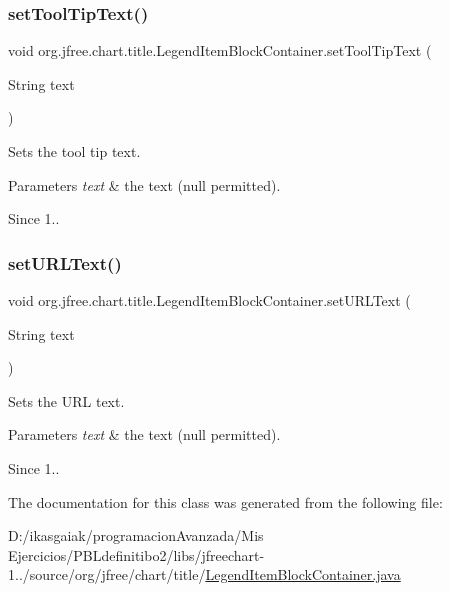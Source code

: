 \subsubsection{\texorpdfstring{set\+Tool\+Tip\+Text()}{setToolTipText()}}
{\footnotesize\ttfamily void org.\+jfree.\+chart.\+title.\+Legend\+Item\+Block\+Container.\+set\+Tool\+Tip\+Text (\begin{DoxyParamCaption}\item[{String}]{text }\end{DoxyParamCaption})}

Sets the tool tip text.


\begin{DoxyParams}{Parameters}
{\em text} & the text ({\ttfamily null} permitted).\\
\hline
\end{DoxyParams}
\begin{DoxySince}{Since}
1.. 
\end{DoxySince}
\mbox{\label{classorg_1_1jfree_1_1chart_1_1title_1_1_legend_item_block_container_a0e31f43e709e5fa5409560bd0bc57f59}} 
\subsubsection{\texorpdfstring{set\+U\+R\+L\+Text()}{setURLText()}}
{\footnotesize\ttfamily void org.\+jfree.\+chart.\+title.\+Legend\+Item\+Block\+Container.\+set\+U\+R\+L\+Text (\begin{DoxyParamCaption}\item[{String}]{text }\end{DoxyParamCaption})}

Sets the U\+RL text.


\begin{DoxyParams}{Parameters}
{\em text} & the text ({\ttfamily null} permitted).\\
\hline
\end{DoxyParams}
\begin{DoxySince}{Since}
1.. 
\end{DoxySince}


The documentation for this class was generated from the following file\+:\begin{DoxyCompactItemize}
\item 
D\+:/ikasgaiak/programacion\+Avanzada/\+Mis Ejercicios/\+P\+B\+Ldefinitibo2/libs/jfreechart-\/1../source/org/jfree/chart/title/\mbox{\hyperlink{_legend_item_block_container_8java}{Legend\+Item\+Block\+Container.\+java}}\end{DoxyCompactItemize}
